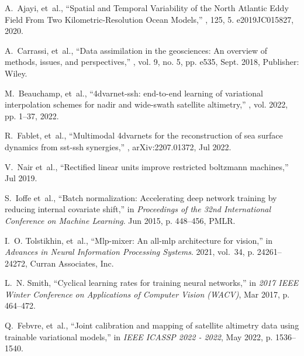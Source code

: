 \begin{bibunit}
\begin{thebibliography}{10}
A.~Ajayi, et~al.,
\newblock ``Spatial and {Temporal} {Variability} of the {North} {Atlantic}
  {Eddy} {Field} {From} {Two} {Kilometric}-{Resolution} {Ocean} {Models},''
, 125, 5.
  e2019JC015827, 2020.

A.~Carrassi, et~al.,
\newblock ``Data assimilation in the geosciences: {An} overview of methods,
  issues, and perspectives,''
, vol. 9, no. 5,
  pp. e535, Sept. 2018,
\newblock Publisher: Wiley.

M.~Beauchamp, et~al.,
\newblock ``4dvarnet-ssh: end-to-end learning of variational interpolation
  schemes for nadir and wide-swath satellite altimetry,''
, vol. 2022, pp.
  1–37, 2022.

R.~Fablet, et~al.,
\newblock ``Multimodal 4dvarnets for the reconstruction of sea surface dynamics
  from sst-ssh synergies,''
\newblock , arXiv:2207.01372, Jul 2022.

V.~Nair et~al.,
\newblock ``Rectified linear units improve restricted boltzmann machines,''
\newblock Jul 2019.

S.~Ioffe et~al.,
\newblock ``Batch normalization: Accelerating deep network training by reducing
  internal covariate shift,''
\newblock in {\em Proceedings of the 32nd International Conference on Machine
  Learning}. Jun 2015, p. 448–456, PMLR.

I.~O. Tolstikhin, et~al.,
\newblock ``Mlp-mixer: An all-mlp architecture for vision,''
\newblock in {\em Advances in Neural Information Processing Systems}. 2021,
  vol.~34, p. 24261–24272, Curran Associates, Inc.

L.~N. Smith,
\newblock ``Cyclical learning rates for training neural networks,''
\newblock in {\em 2017 IEEE Winter Conference on Applications of Computer
  Vision (WACV)}, Mar 2017, p. 464–472.

Q.~Febvre, et~al.,
\newblock ``Joint calibration and mapping of satellite altimetry data using
  trainable variational models,''
\newblock in {\em IEEE ICASSP 2022 - 2022}, May 2022, p. 1536–1540.

\end{thebibliography}


\end{bibunit}

